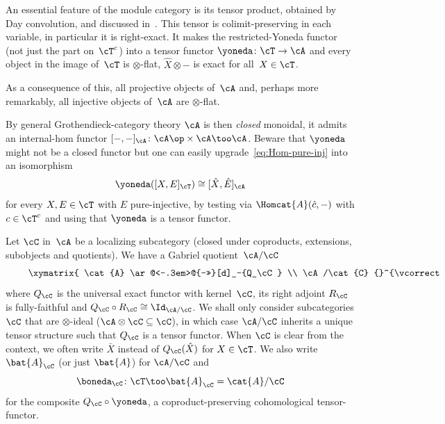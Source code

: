 \begin{Rec}
\label{Rec:tensor-on-MT}
An essential feature of the module category is its tensor product, obtained by Day convolution, and discussed in~\cite[App.\,A]{BalmerKrauseStevenson20}. This tensor is colimit-preserving in each variable, in particular it is right-exact. It makes the restricted-Yoneda functor (not just the part on~$\cT^c$) into a tensor functor $\yoneda\colon \cT\to \cA$ and every object in the image of~$\cT$ is $\otimes$-flat, \ie $\hat X\otimes-$ is exact for all~$X\in\cT$.

As a consequence of this, all projective objects of~$\cA$ and, perhaps more remarkably, all injective objects of~$\cA$ are $\otimes$-flat.

By general Grothendieck-category theory $\cA$ is then \emph{closed} monoidal, \ie it admits an internal-hom functor $[-,-]_\cA\colon \cA\op\times \cA\too\cA$. Beware that $\yoneda$ might not be a closed functor but one can easily upgrade~\eqref{eq:Hom-pure-inj} into an isomorphism
\begin{equation}
\label{eq:[-,E]}
\yoneda([X,E]_\cT)\cong [\hat X,\hat E]_\cA
\end{equation}
for every $X,E\in\cT$ with $E$ pure-injective, by testing via $\Homcat{A}(\hat c,-)$ with $c\in\cT^c$ and using that $\yoneda$ is a tensor functor.
\end{Rec}

\begin{Rec}
\label{Rec:A/C}
Let $\cC$ in~$\cA$ be a localizing subcategory (\ie closed under coproducts, extensions, subobjects and quotients). We have a Gabriel quotient~$\cA/\cC$
\begin{equation}
\label{eq:A/C}
\vcenter{\xymatrix{
\cat{A} \ar@<-.3em>@{->>}[d]_-{Q_\cC}
\\
\cA/\cat{C} {}^{\vcorrect{.6}} \ar@<-.3em>@{_{ (}->}[u]_-{R_\cC}
}}
\end{equation}
where $Q_\cC$ is the universal exact functor with kernel~$\cC$, its right adjoint $R_\cC$ is fully-faithful and $Q_\cC\circ R_\cC\cong\Id_{\cA/\cC}$. We shall only consider subcategories $\cC$ that are $\otimes$-ideal ($\cA\otimes \cC\subseteq\cC$), in which case $\cA/\cC$ inherits a unique tensor structure such that $Q_\cC$ is a tensor functor. When $\cC$ is clear from the context, we often write $\bar{X}$ instead of $Q_\cC(\hat X)$ for $X\in\cT$. We also write $\bat{A}_{\cC}$ (or just $\bat{A}$) for $\cA/\cC$ and
\begin{equation}
\label{eq:hC}
\boneda_{\cC}\colon \cT\too \bat{A}_\cC=\cat{A}/\cC
\end{equation}
for the composite $Q_\cC\circ \yoneda$, a coproduct-preserving cohomological tensor-functor.
\end{Rec}

